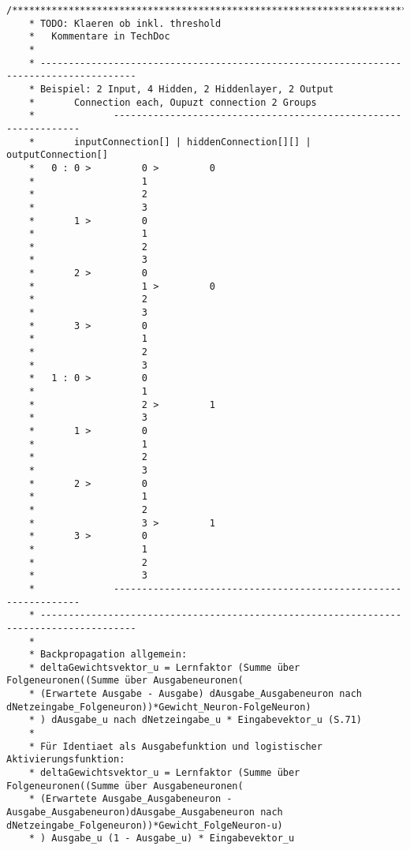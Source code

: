 \begin{lstlisting}
/****************************************************************************************
	* TODO: Klaeren ob inkl. threshold
	*	Kommentare in TechDoc
	*	
	* ---------------------------------------------------------------------------------------
	* Beispiel:	2 Input, 4 Hidden, 2 Hiddenlayer, 2 Output
	*		Connection each, Oupuzt connection 2 Groups
	*              ----------------------------------------------------------------
	*		inputConnection[] | hiddenConnection[][] | outputConnection[]
	*	0 :	0 >			0 >			0
	*					1
	*					2
	*					3
	*		1 >			0
	*					1
	*					2
	*					3
	*		2 >			0
	*					1 >			0
	*					2
	*					3
	*		3 >			0
	*					1
	*					2
	*					3
	*	1 :	0 >			0
	*					1
	*					2 >			1
	*					3
	*		1 >			0
	*					1
	*					2
	*					3
	*		2 >			0
	*					1
	*					2
	*					3 >			1
	*		3 >			0
	*					1
	*					2
	*					3
	*              ----------------------------------------------------------------
	* ---------------------------------------------------------------------------------------
	*
	* Backpropagation allgemein:
	* deltaGewichtsvektor_u = Lernfaktor (Summe über Folgeneuronen((Summe über Ausgabeneuronen(
	* (Erwartete Ausgabe - Ausgabe) dAusgabe_Ausgabeneuron nach dNetzeingabe_Folgeneuron))*Gewicht_Neuron-FolgeNeuron)
	* ) dAusgabe_u nach dNetzeingabe_u * Eingabevektor_u (S.71)
	*
	* Für Identiaet als Ausgabefunktion und logistischer Aktivierungsfunktion:
	* deltaGewichtsvektor_u = Lernfaktor (Summe über Folgeneuronen((Summe über Ausgabeneuronen(
	* (Erwartete Ausgabe_Ausgabeneuron - Ausgabe_Ausgabeneuron)dAusgabe_Ausgabeneuron nach dNetzeingabe_Folgeneuron))*Gewicht_FolgeNeuron-u)
	* ) Ausgabe_u (1 - Ausgabe_u) * Eingabevektor_u
	

\end{lstlisting}
